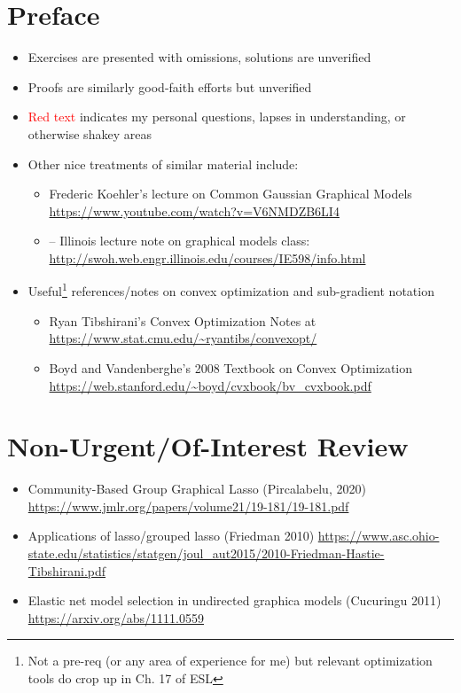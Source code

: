 \documentclass[11pt]{article}
\begin{document}
\section*{Preface}

\begin{itemize}
    \item Exercises are presented with omissions, solutions are unverified 
    \item Proofs are similarly good-faith efforts but unverified 
    \item \textcolor{red}{Red text} indicates my personal questions, lapses in understanding, or otherwise shakey areas 
    \item Other nice treatments of similar material include:
    \begin{itemize}
            \item Frederic Koehler's lecture on Common Gaussian Graphical Models \url{https://www.youtube.com/watch?v=V6NMDZB6LI4}
        	\item -- Illinois lecture note on graphical models class: \url{http://swoh.web.engr.illinois.edu/courses/IE598/info.html}
    \end{itemize}
    \item Useful\footnote{Not a pre-req (or any area of experience for me) but relevant optimization tools do crop up in Ch. 17 of ESL} references/notes on convex optimization and sub-gradient notation 
    \begin{itemize}
            \item Ryan Tibshirani's Convex Optimization Notes at \url{https://www.stat.cmu.edu/~ryantibs/convexopt/}
            \item Boyd and Vandenberghe's 2008 Textbook on Convex Optimization \url{https://web.stanford.edu/~boyd/cvxbook/bv_cvxbook.pdf}
    \end{itemize}
\end{itemize}

\section*{Non-Urgent/Of-Interest Review}

\begin{itemize}
    \item Community-Based Group Graphical Lasso (Pircalabelu, 2020) \url{https://www.jmlr.org/papers/volume21/19-181/19-181.pdf}
    \item Applications of lasso/grouped lasso (Friedman 2010) \url{https://www.asc.ohio-state.edu/statistics/statgen/joul_aut2015/2010-Friedman-Hastie-Tibshirani.pdf}
    \item Elastic net model selection in undirected graphica models (Cucuringu 2011) \url{https://arxiv.org/abs/1111.0559}
\end{itemize}
\end{document}
